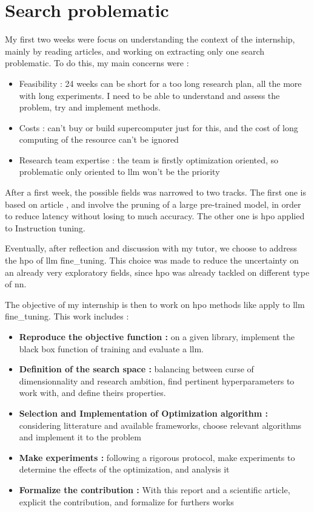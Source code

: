 \section{Search problematic}
My first two weeks were focus on understanding the context of the internship, mainly by reading articles, and working on extracting only one search problematic. To do this, my main concerns were : 
\begin{itemize}
    \item Feasibility : 24 weeks can be short for a too long research plan, all the more with long experiments. I need to be able to understand and assess the problem, try and implement methods.
    \item Costs : can't buy or build supercomputer just for this, and the cost of long computing of the resource can't be ignored 
    \item Research team expertise : the team is firstly optimization oriented, so problematic only oriented to \acrshort{llm} won't be the priority
\end{itemize}

After a first week, the possible fields was narrowed to two tracks. The first one is based on article \cite{klein_structural_2023}, and involve the pruning of a large pre-trained model, in order to reduce latency without losing to much accuracy. The other one \cite{tribes_hyperparameter_2024} is \acrlong{hpo} applied to Instruction tuning.  

Eventually, after reflection and discussion with my tutor, we choose to address the \acrshort{hpo} of \acrshort{llm} \gls{fine_tuning}. This choice was made to reduce the uncertainty on an already very exploratory fields, since \acrshort{hpo} was already tackled on different type of \acrshort{nn}. 

The objective of my internship is then to work on \acrshort{hpo} methods like apply to \acrshort{llm} \gls{fine_tuning}. This work includes : 
\begin{itemize}
    \item \textbf{Reproduce the objective function :} on a given library, implement the black box function of training and evaluate a \acrshort{llm}.
    \item \textbf{Definition of the search space : }balancing between curse of dimensionnality and research ambition, find pertinent \glspl{hyperparameter} to work with, and define theirs properties.
    \item \textbf{Selection and Implementation of Optimization algorithm :} considering litterature and available frameworks, choose relevant algorithms and implement it to the problem
    \item \textbf{Make experiments :} following a rigorous protocol, make experiments to determine the effects of the optimization, and analysis it
    \item \textbf{Formalize the contribution :} With this report and a scientific article, explicit the contribution, and formalize for furthers works
\end{itemize}

